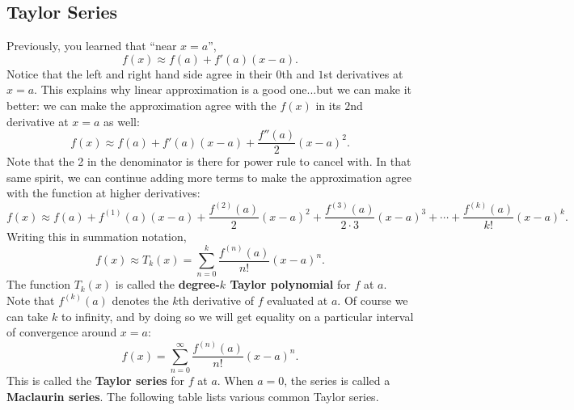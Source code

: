 \subsection{Taylor Series}

Previously, you learned that ``near $x=a$'',
$$f(x)\approx f(a)+f'(a)(x-a).$$
Notice that the left and right hand side agree in their $0$th and $1$st derivatives at $x=a$. This explains why linear approximation is a good one...but we can make it better: we can make the approximation agree with the $f(x)$ in its $2$nd derivative at $x=a$ as well:
$$f(x)\approx f(a)+f'(a)(x-a)+\frac{f''(a)}{2}(x-a)^2.$$
Note that the 2 in the denominator is there for power rule to cancel with. In that same spirit, we can continue adding more terms to make the approximation agree with the function at higher derivatives:
$$f(x) \approx f(a)+f^{(1)}(a)(x-a)+\frac{f^{(2)}(a)}{2}(x-a)^2+\frac{f^{(3)}(a)}{2\cdot 3}(x-a)^3+\cdots+\frac{f^{(k)}(a)}{k!}(x-a)^k.$$
Writing this in summation notation,
$$f(x)\approx T_k(x)=\sum_{n=0}^k\frac{f^{(n)}(a)}{n!}(x-a)^n.$$
The function $T_k(x)$ is called the \textbf{degree-$k$ Taylor polynomial} for $f$ at $a$. Note that $f^{(k)}(a)$ denotes the $k$th derivative of $f$ evaluated at $a$. Of course we can take $k$ to infinity, and by doing so we will get equality on a particular interval of convergence around $x=a$:
$$f(x)= \sum_{n=0}^\infty\frac{f^{(n)}(a)}{n!}(x-a)^n.$$
This is called the \textbf{Taylor series} for $f$ at $a$. When $a=0$, the series is called a \textbf{Maclaurin series}. The following table lists various common Taylor series.

